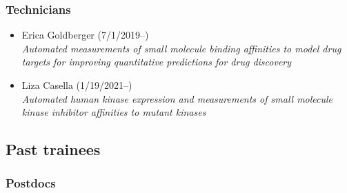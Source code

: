 \documentclass[10pt]{article}
\begin{document}
\subsubsection*{Technicians}

\begin{itemize}
  \item Erica Goldberger (7/1/2019--)\\
  \emph{Automated measurements of small molecule binding affinities to model drug targets for improving quantitative predictions for drug discovery}

  \item Liza Casella (1/19/2021--)\\
  \emph{Automated human kinase expression and measurements of small molecule kinase inhibitor affinities to mutant kinases}

\end{itemize}

\eject

\subsection*{Past trainees}

\subsubsection*{Postdocs}
\end{document}
